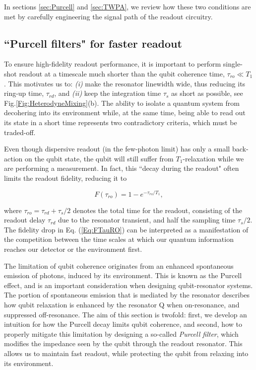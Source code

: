 \documentclass[aip,apr,twocolumn,showpacs,superscriptaddress,groupedaddress,nofootinbib,reprint]{revtex4-1}  %
\begin{document}
In sections \ref{sec:Purcell} and \ref{sec:TWPA}, we review how these two conditions are met by carefully engineering the signal path of the readout circuitry.

\subsection{\label{sec:Purcell} ``Purcell filters" for faster readout}

To ensure high-fidelity readout performance, it is important to perform single-shot readout at a timescale much shorter than the qubit coherence time, $\tau_{ro} \ll T_1$. This motivates us to: \textit{(i)} make the resonator linewidth wide, thus reducing its ring-up time, $\tau_{rd}$, and \textit{(ii)} keep the integration time $\tau_s$ as short as possible, see Fig.\ref{Fig:HeterodyneMixing}(b). The ability to isolate a quantum system from decohering into its environment while, at the same time, being able to read out its state in a short time represents two contradictory criteria, which must be traded-off\cite{Caves1982}.

Even though dispersive readout (in the few-photon limit) has only a small back-action on the qubit state, the qubit will still suffer from $T_1$-relaxation while we are performing a measurement. In fact, this ``decay during the readout" often limits the readout fidelity, reducing it to

\begin{equation}
F(\tau_{ro}) = 1-e^{-\tau_{ro}/T_1},
\label{Eq:FTauRO}
\end{equation}

\noindent where $\tau_{ro} = \tau_{rd} + \tau_{s}/2$ denotes the total time for the readout, consisting of the readout delay $\tau_{rd}$ due to the resonator transient, and half the sampling time $\tau_{s}/2$. The fidelity drop in Eq. (\ref{Eq:FTauRO}) can be interpreted as a manifestation of the competition between the time scales at which our quantum information reaches our detector or the environment first.

The limitation of qubit coherence originates from an enhanced spontaneous emission of photons, induced by its environment. This is known as the Purcell effect\cite{Purcell1946}, and is an important consideration when designing qubit-resonator systems\cite{Houck2008}. The portion of spontaneous emission that is mediated by the resonator describes how qubit relaxation is enhanced by the resonator Q when on-resonance, and suppressed off-resonance. The aim of this section is twofold: first, we develop an intuition for how the Purcell decay limits qubit coherence, and second, how to properly mitigate this limitation by designing a so-called \textit{Purcell filter}, which modifies the impedance seen by the qubit through the readout resonator. This allows us to maintain fast readout, while protecting the qubit from relaxing into its environment.
\end{document}
